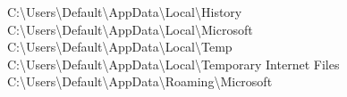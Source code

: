 C:\textbackslash Users\textbackslash Default\textbackslash AppData\textbackslash Local\textbackslash History \\
C:\textbackslash Users\textbackslash Default\textbackslash AppData\textbackslash Local\textbackslash Microsoft \\
C:\textbackslash Users\textbackslash Default\textbackslash AppData\textbackslash Local\textbackslash Temp \\
C:\textbackslash Users\textbackslash Default\textbackslash AppData\textbackslash Local\textbackslash Temporary Internet Files \\
C:\textbackslash Users\textbackslash Default\textbackslash AppData\textbackslash Roaming\textbackslash Microsoft \\
